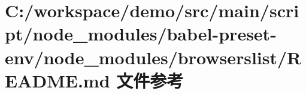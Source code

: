 \hypertarget{node__modules_2babel-preset-env_2node__modules_2browserslist_2_r_e_a_d_m_e_8md}{}\section{C\+:/workspace/demo/src/main/script/node\+\_\+modules/babel-\/preset-\/env/node\+\_\+modules/browserslist/\+R\+E\+A\+D\+ME.md 文件参考}
\label{node__modules_2babel-preset-env_2node__modules_2browserslist_2_r_e_a_d_m_e_8md}
